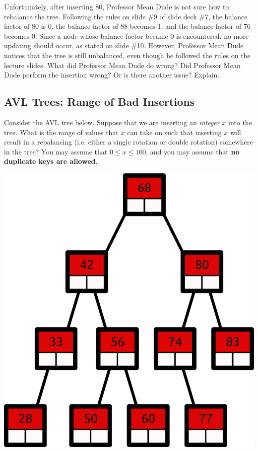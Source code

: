 \documentclass{article}
\begin{document}
Unfortunately, after inserting $80$, Professor Mean Dude is not sure how to rebalance the tree. Following the rules on slide \#9 of slide deck \#7, the balance factor of $80$ is $0$, the balance factor of $88$ becomes $1$, and the balance factor of $76$ becomes $0$. Since a node whose balance factor became $0$ is encountered, no more updating should occur, as stated on slide \#10. However, Professor Mean Dude notices that the tree is still unbalanced, even though he followed the rules on the lecture slides. What did Professor Mean Dude do wrong? Did Professor Mean Dude perform the insertion wrong? Or is there another issue? Explain.

\begin{mdframed}
\vspace{3em}
\end{mdframed}

\subsection{AVL Trees: Range of Bad Insertions}

Consider the AVL tree below. Suppose that we are inserting an \textit{integer} $x$ into the tree. What is the range of values that $x$ can take on such that inserting $x$ will result in a rebalancing (i.e. either a single rotation or double rotation) somewhere in the tree? You may assume that $0 \le x \le 100$, and you may assume that \textbf{no duplicate keys are allowed}.

\includegraphics[scale=0.35]{avl_tree_range_problem}
\end{document}
